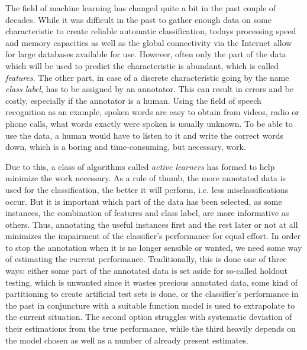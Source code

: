 
The field of machine learning has changed quite a bit in the past couple of decades. While it was difficult in the past to gather enough data on some characteristic to create reliable automatic classification, todays processing speed and memory capacities as well as the global connectivity via the Internet allow for large databases available for use. However, often only the part of the data which will be used to predict the characteristic is abundant, which is called \textit{features}. The other part, in case of a discrete characteristic going by the name \textit{class label}, has to be assigned by an annotator. This can result in errors and be costly, especially if the annotator is a human. Using the field of speech recognition as an example, spoken words are easy to obtain from videos, radio or phone calls, what words exactly were spoken is usually unknown. To be able to use the data, a human would have to listen to it and write the correct words down, which is a boring and time-consuming, but necessary, work.

Due to this, a class of algorithms called \textit{active learners} has formed to help minimize the work necessary. As a rule of thumb, the more annotated data is used for the classification, the better it will perform, i.e. less misclassifications occur. But it is important which part of the data has been selected, as some instances, the combination of features and class label, are more informative as others. Thus, annotating the useful instances first and the rest later or not at all minimizes the impairment of the classifier's performance for equal effort. In order to stop the annotation when it is no longer sensible or wanted, we need some way of estimating the current performance. Traditionally, this is done one of three ways: either some part of the annotated data is set aside for so-called holdout testing, which is unwanted since it wastes precious annotated data, some kind of partitioning to create artificial test sets is done, or the classifier's performance in the past in conjuncture with a suitable function model is used to extrapolate to the current situation. The second option struggles with systematic deviation of their estimations from the true performance, while the third heavily depends on the model chosen as well as a number of already present estimates.

